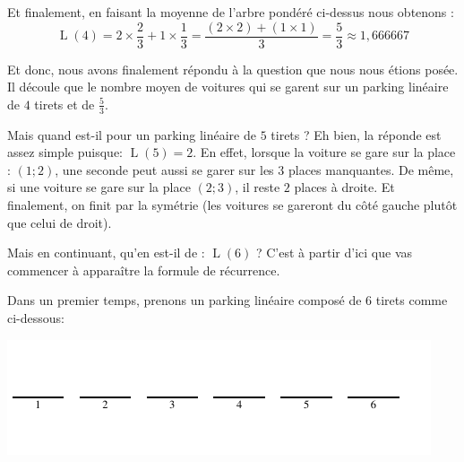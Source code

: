 \documentclass[a4paper,francais,11pt]{article}
\begin{document}
Et finalement, en faisant la moyenne de l'arbre pondéré ci-dessus nous obtenons :
\[\operatorname{L}\left(4\right)=2\times\frac{2}{3}+1\times\frac{1}{3}=\frac{\left(2\times2\right)+\left(1\times1\right)}{3}=\frac{5}{3}\approx1{,}666667\]

Et donc, nous avons finalement répondu à la question que nous nous étions posée. Il découle que le nombre moyen de voitures qui se garent sur un parking linéaire de $4$ tirets et de $\frac{5}{3}$. 

Mais quand est-il pour un parking linéaire de $5$ tirets ? Eh bien, la réponde est assez simple puisque: $\operatorname{L}\left(5\right)=2$. En effet, lorsque la voiture se gare sur la place : $(1;2)$, une seconde peut aussi se garer sur les $3$ places manquantes. De même, si une voiture se gare sur la place $(2;3)$, il reste $2$ places à droite. Et finalement, on finit par la symétrie (les voitures se gareront du côté gauche plutôt que celui de droit).

Mais en continuant, qu'en est-il de : $\operatorname{L}\left(6\right)$ ? C'est à partir d'ici que vas commencer à apparaître la formule de récurrence.

Dans un premier temps, prenons un parking linéaire composé de $6$ tirets comme ci-dessous:
\begin{center}
\includegraphics{fig13.pdf}
\end{center}
\end{document}
